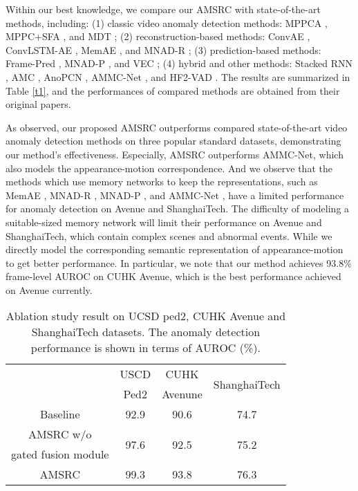 \documentclass[sigconf]{acmart}
\begin{document}
Within our best knowledge, we compare our AMSRC with state-of-the-art methods, including: (1) classic video anomaly detection methods: MPPCA \cite{kim2009observe}, MPPC+SFA \cite{mahadevan2010anomaly}, and MDT \cite{mahadevan2010anomaly}; (2) reconstruction-based methods: ConvAE \cite{hasan2016learning}, ConvLSTM-AE \cite{luo2017remembering}, MemAE \cite{gong2019memorizing}, and MNAD-R \cite{park2020learning}; (3) prediction-based methods: Frame-Pred \cite{liu2018future}, MNAD-P \cite{park2020learning}, and VEC \cite{yu2020cloze}; (4) hybrid and other methods: Stacked RNN \cite{luo2017revisit}, AMC \cite{nguyen2019anomaly}, AnoPCN \cite{ye2019anopcn}, AMMC-Net \cite{cai2021appearance}, and HF2-VAD \cite{liu2021hybrid}. The results are summarized in Table \ref{t1}, and the performances of compared methods are obtained from their original papers.





As observed, our proposed AMSRC outperforms compared state-of-the-art video anomaly detection methods on three popular standard datasets, demonstrating our method's effectiveness. Especially, AMSRC outperforms AMMC-Net, which also models the appearance-motion correspondence. And we observe that the methods which use memory networks to keep the representations, such as MemAE \cite{gong2019memorizing}, MNAD-R \cite{park2020learning}, MNAD-P \cite{park2020learning}, and AMMC-Net \cite{cai2021appearance}, have a limited performance for anomaly detection on Avenue and ShanghaiTech. The difficulty of modeling a suitable-sized memory network will limit their performance on Avenue and ShanghaiTech, which contain complex scenes and abnormal events. While we directly model the corresponding semantic representation of appearance-motion to get better performance. In particular, we note that our method achieves 93.8\% frame-level AUROC on CUHK Avenue, which is the best performance achieved on Avenue currently.
\begin{table}[htbp]
	\centering
	\caption{Ablation study result on UCSD ped2, CUHK Avenue and ShanghaiTech datasets. The anomaly detection performance is shown in terms of AUROC (\%).}
	\begin{tabular}{cccc}
		\toprule[1.5pt]
		\multicolumn{1}{c}{\multirow{2}{*}{}} 	    & USCD & CUHK &
		\multicolumn{1}{c}{\multirow{2}{*}{ShanghaiTech}} \\
		                                  & Ped2  & Avenune &  \\
		\midrule[1.5pt]
		Baseline                          & 92.9  & 90.6  & 74.7 \\
		AMSRC w/o & \multirow{2}{*}{97.6} & \multirow{2}{*}{92.5} & \multirow{2}{*}{75.2} \\
		gated fusion module 			  &       &       &  \\
		AMSRC 				              & 99.3  & 93.8  & 76.3 \\
		\bottomrule[1.5pt]
	\end{tabular}
	\label{t2}
\end{table}
\end{document}
